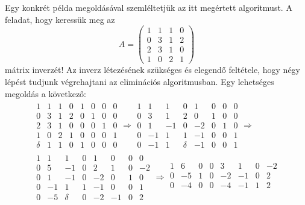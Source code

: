 \documentclass[a4paper, showtrims]{memoir}
\theoremstyle{plain}
\theoremstyle{remark}
\theoremstyle{definition}
\begin{document}
Egy konkrét példa megoldásával szemléltetjük az itt megértett algoritmust.
A feladat, hogy keressük meg az
\[
A=
\begin{pmatrix}
	1 & 1 & 1 & 0 \\
	0 & 3 & 1 & 2 \\
	2 & 3 & 1 & 0 \\
	1 & 0 & 2 & 1
\end{pmatrix}
\]
mátrix inverzét!
Az inverz létezésének szükséges és elegendő feltétele, hogy négy lépést tudjunk végrehajtani az eliminációs algoritmusban.
Egy lehetséges megoldás a következő:
\begin{multline*}
	\begin{array}{cccc|cccc}
		\boxed{1} & 1 & 1 & 0 & 1 & 0 & 0 & 0 \\
		0         & 3 & 1 & 2 & 0 & 1 & 0 & 0 \\
		2         & 3 & 1 & 0 & 0 & 0 & 1 & 0 \\
		1         & 0 & 2 & 1 & 0 & 0 & 0 & 1 \\
		\hline
		\delta    & 1 & 1 & 0 & 1 & 0 & 0 & 0
	\end{array}\Longrightarrow
	\begin{array}{cccc|cccc}
		1 & 1  & 1  & 0         & 1  & 0 & 0 & 0 \\
		0 & 3  & 1  & 2         & 0  & 1 & 0 & 0 \\
		0 & 1  & -1 & 0         & -2 & 0 & 1 & 0 \\
		0 & -1 & 1  & \boxed{1} & -1 & 0 & 0 & 1 \\
		\hline
		0 & -1 & 1  & \delta    & -1 & 0 & 0 & 1
	\end{array}\Longrightarrow
	\\
	\begin{array}{cccc|cccc}
		1 & 1  & 1          & 0 & 1  & 0  & 0 & 0  \\
		0 & 5  & \boxed{-1} & 0 & 2  & 1  & 0 & -2 \\
		0 & 1  & -1         & 0 & -2 & 0  & 1 & 0  \\
		0 & -1 & 1          & 1 & -1 & 0  & 0 & 1  \\
		\hline
		0 & -5 & \delta     & 0 & -2 & -1 & 0 & 2
	\end{array}\Longrightarrow
	\begin{array}{cccc|cccc}
		1 & 6          & 0 & 0 & 3  & 1           & 0            & -2           \\
		0 & -5         & 1 & 0 & -2 & -1          & 0            & 2            \\
		0 & \boxed{-4} & 0 & 0 & -4 & -1          & 1            & 2            \\

\end{array}
\end{multline*}
\end{document}
